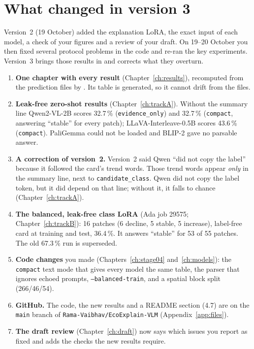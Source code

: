 \section{What changed in version 3}

Version~2 (19 October) added the explanation LoRA, the exact input of each model, a check of your figures and a review of your draft. On 19--20 October you then fixed several protocol problems in the code and re-ran the key experiments. Version~3 brings those results in and corrects what they overturn.

\begin{newinfo}
\begin{enumerate}
  \item \textbf{One chapter with every result} (Chapter~\ref{ch:results}), recomputed from the prediction files by . Its table is generated, so it cannot drift from the files.
  \item \textbf{Leak-free zero-shot results} (Chapter~\ref{ch:trackA}). Without the summary line Qwen2-VL-2B scores 32.7\,\% (\texttt{evidence\_only}) and 32.7\,\% (\texttt{compact}, answering ``stable'' for every patch); LLaVA-Interleave-0.5B scores 43.6\,\% (\texttt{compact}). PaliGemma could not be loaded and BLIP-2 gave no parsable answer.
  \item \textbf{A correction of version~2.} Version~2 said Qwen ``did not copy the label'' because it followed the card's trend words. Those trend words appear \emph{only} in the summary line, next to \texttt{candidate\_class}. Qwen did not copy the label token, but it did depend on that line; without it, it falls to chance (Chapter~\ref{ch:trackA}).
  \item \textbf{The balanced, leak-free class LoRA} (Ada job 29575; Chapter~\ref{ch:trackB}): 16 patches (6 decline, 5 stable, 5 increase), label-free card at training and test, 36.4\,\%. It answers ``stable'' for 53 of 55 patches. The old 67.3\,\% run is superseded.
  \item \textbf{Code changes} you made (Chapters~\ref{ch:stage04} and~\ref{ch:models}): the \texttt{compact} text mode that gives every model the same table, the parser that ignores echoed prompts, \texttt{--balanced-train}, and a spatial block split (266/46/54).
  \item \textbf{GitHub.} The code, the new results and a README section (4.7) are on the \texttt{main} branch of \texttt{Rama-Vaibhav/EcoExplain-VLM} (Appendix~\ref{app:files}).
  \item \textbf{The draft review} (Chapter~\ref{ch:draft}) now says which issues you report as fixed and adds the checks the new results require.
\end{enumerate}
\end{newinfo}


